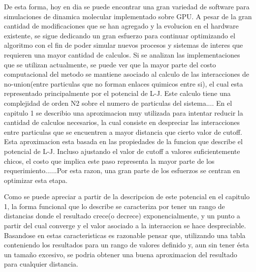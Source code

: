 \documentclass[a4paper,10pt]{report}
\begin{document}
De esta forma, hoy en dia se puede encontrar una gran variedad de software para simulaciones de dinamica molecular implementado sobre GPU. A pesar de la gran cantidad de modificaciones que se han agregado y la evolucion en el hardware existente, se sigue dedicando un gran esfuerzo para continuar optimizando el algoritmo con el fin de poder simular nuevos procesos y sistemas de interes que requieren una mayor cantidad de calculos. 
Si se analizan las implementaciones que se utilizan actualmente, se puede ver que la mayor parte del costo computacional del metodo se mantiene asociado al calculo de las interacciones de no-union(entre particulas que no forman enlaces quimicos entre si), el cual esta representado principalmente por el potencial de L-J. Este calculo tiene una complejidad de orden N2 sobre el numero de particulas del sistema....
En el capitulo 1 se describio una aproximacion muy utilizada para intentar reducir la cantidad de calculos necesarios, la cual consiste en despreciar las interacciones entre particulas que se encuentren a mayor distancia que cierto valor de cutoff. Esta aproximacion esta basada en las propiedades de la funcion que describe el potencial de L-J. Incluso ajustando el valor de cutoff a valores suficientemente chicos, el costo que implica este paso representa la mayor parte de los requerimiento......Por esta razon, una gran parte de los esfuerzos se centran en optimizar esta etapa.
 




Como se puede apreciar a partir de la descripcion de este potencial en el capitulo 1, la forma funcional que lo describe se caracteriza por tener un rango de distancias donde el resultado crece(o decrece) exponencialmente, y un punto a partir del cual converge y el valor asociado a la interaccion se hace despreciable.
Basandose en estas caracteristicas es razonable pensar que, utilizando una tabla conteniendo los resultados para un rango de valores definido y, aun sin tener ésta un tamaño excesivo, se podria obtener una buena aproximacion del resultado para cualquier distancia. 
\end{document}
